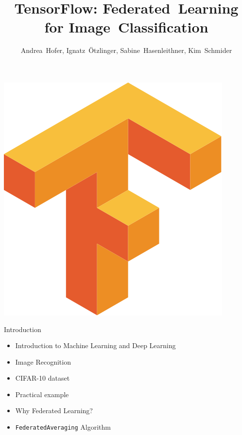 \documentclass{beamer}{}
\title{\huge TensorFlow: Federated~Learning for Image~Classification}
\author{Andrea~Hofer, Ignatz~\"Otzlinger, Sabine~Hasenleithner, Kim~Schmider}
\date{}
\begin{document}
    \begin{frame}[plain]
        \maketitle
        \vspace{-.2\textheight}\center\includegraphics[height=.3\textheight]{img/Tensorflow_logo.png}
    \end{frame}
    \begin{frame} {Introduction}
        \begin{itemize}
            \item Introduction to Machine Learning and Deep Learning
            \item Image Recognition
            \item CIFAR-10 dataset
            \item Practical example
            \item Why Federated Learning?
            \item \texttt{FederatedAveraging} Algorithm
        \end{itemize}
    \end{frame}
\end{document}
